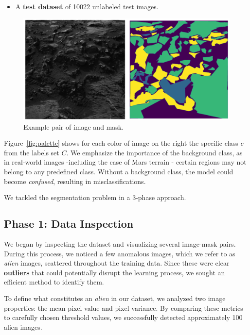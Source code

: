 \documentclass[11pt]{article}
\begin{document}
\begin{multicols*}{2}
\begin{itemize}
        \item A \textbf{test dataset} of 10022 unlabeled test images.
    \end{itemize}

    \begin{figure}[H]
            \centering
            \includegraphics[width=\linewidth]{figures/mars1.png}
            \caption{Example pair of image and mask.}
            \label{fig:mars1}
    \end{figure}

    \noindent Figure~\ref{fig:palette} shows for each color of image on the right the specific class $c$ from the labels set $C$. We emphasize the importance of the background class, as in real-world images -including the case of Mars terrain - certain regions may not belong to any predefined class. Without a background class, the model could become \emph{confused}, resulting in misclassifications.
    
    We tackled the segmentation problem in a 3-phase approach.

    \subsection{Phase 1: Data Inspection}

    We began by inspecting the dataset and visualizing several image-mask pairs. During this process, we noticed a few anomalous images, which we refer to as \emph{alien} images, scattered throughout the training data. Since these were clear \textbf{outliers} that could potentially disrupt the learning process, we sought an efficient method to identify them.
    
    To define what constitutes an \emph{alien} in our dataset, we analyzed two image properties: the mean pixel value and pixel variance. By comparing these metrics to carefully chosen threshold values, we successfully detected approximately 100 alien images.
    

\end{multicols*}
\end{document}
